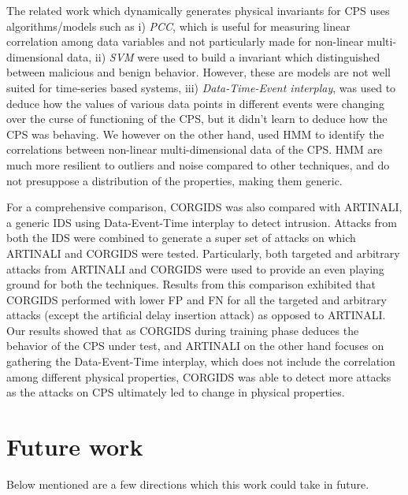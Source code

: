 The related work which dynamically generates physical invariants for \ac{CPS} uses algorithms/models such as i) \textit{\acf{PCC}}, which is useful for measuring linear correlation among data variables and not particularly made for non-linear multi-dimensional data, ii) \textit{\acf{SVM}} were used to build a invariant which distinguished between malicious and benign behavior. However, these are models are not well suited for time-series based systems, iii) \textit{Data-Time-Event interplay}, was used to deduce how the values of various data points in different events were changing over the curse of functioning of the \ac{CPS}, but it didn't learn to deduce how the \ac{CPS} was behaving. We however on the other hand, used \acf{HMM} to identify the correlations between non-linear multi-dimensional data of the \ac{CPS}. \ac{HMM} are much more resilient to outliers and noise compared to other techniques, and do not presuppose a distribution of the properties, making them generic.

For a comprehensive comparison, \ac{CORGIDS} was also compared with ARTINALI, a generic \ac{IDS} using Data-Event-Time interplay to detect intrusion. Attacks from both the \ac{IDS} were combined to generate a super set of attacks on which ARTINALI and \ac{CORGIDS} were tested. Particularly, both targeted and arbitrary attacks from ARTINALI and \ac{CORGIDS} were used to provide an even playing ground for both the techniques. Results from this comparison exhibited that \ac{CORGIDS} performed with lower \ac{FP} and \ac{FN} for all the targeted and arbitrary attacks (except the artificial delay insertion attack) as opposed to ARTINALI. Our results showed 
that as \ac{CORGIDS} during training phase deduces the behavior of the \ac{CPS} under test, and ARTINALI on the other hand focuses on gathering the Data-Event-Time interplay, which does not include the correlation among different physical properties, \ac{CORGIDS} was able to detect more attacks as the attacks on \ac{CPS} ultimately led to change in physical properties.


\section{Future work}
Below mentioned are a few directions which this work could take in future.

